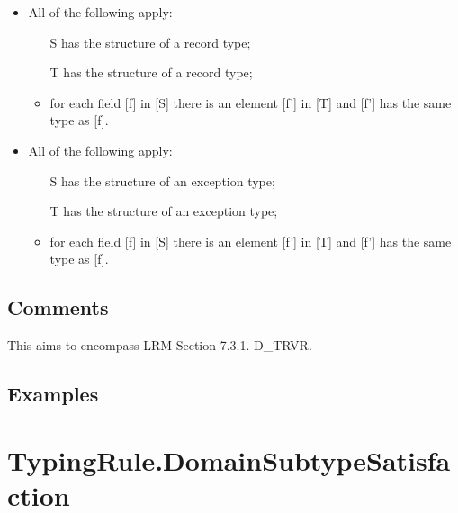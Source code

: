 \documentclass{book}
\begin{document}
\begin{itemize}
  \item  All of the following apply:
    \begin{itemize}
    \item  [S] has the structure of a record type;
    \item  [T] has the structure of a record type;
    \item  for each field [f] in [S] there is an element [f'] in [T] and [f'] has
      the same type as [f].
    \end{itemize}

  \item  All of the following apply:
    \begin{itemize}
    \item  [S] has the structure of an exception type;
    \item  [T] has the structure of an exception type;
    \item  for each field [f] in [S] there is an element [f'] in [T] and [f'] has
      the same type as [f].
    \end{itemize}
  \end{itemize}

\subsection{Comments}
  This aims to encompass LRM Section 7.3.1. D\_TRVR.

\subsection{Examples}

\section{TypingRule.DomainSubtypeSatisfaction}
\end{document}
